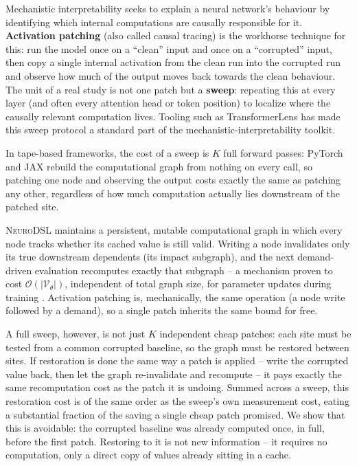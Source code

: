 \documentclass{article}
\begin{document}
Mechanistic interpretability seeks to explain a neural network's behaviour by identifying which
internal computations are causally responsible for it. \textbf{Activation patching} (also called
causal tracing) \cite{rome,causalmediation} is the workhorse technique for this: run the model
once on a ``clean'' input and once on a ``corrupted'' input, then copy a single internal
activation from the clean run into the corrupted run and observe how much of the output moves
back towards the clean behaviour. The unit of a real study is not one patch but a \textbf{sweep}:
repeating this at every layer (and often every attention head or token position) to localize
where the causally relevant computation lives. Tooling such as TransformerLens
\cite{transformerlens} has made this sweep protocol a standard part of the
mechanistic-interpretability toolkit.

In tape-based frameworks, the cost of a sweep is $K$ full forward passes: PyTorch \cite{pytorch}
and JAX \cite{jax} rebuild the computational graph from nothing on every call, so patching one
node and observing the output costs exactly the same as patching any other, regardless of how
much computation actually lies downstream of the patched site.

\textsc{NeuroDSL} \cite{neurodsl} maintains a persistent, mutable computational graph in which
every node tracks whether its cached value is still valid. Writing a node invalidates only its
true downstream dependents (its impact subgraph), and the next demand-driven evaluation
recomputes exactly that subgraph -- a mechanism proven to cost
$\mathcal{O}(|\mathcal{V}_{\theta}|)$, independent of total graph size, for parameter updates
during training \cite{neurodsl}. Activation patching is, mechanically, the same operation (a node
write followed by a demand), so a single patch inherits the same bound for free.

A full sweep, however, is not just $K$ independent cheap patches: each site must be tested from a
common corrupted baseline, so the graph must be restored between sites. If restoration is done
the same way a patch is applied -- write the corrupted value back, then let the graph
re-invalidate and recompute -- it pays exactly the same recomputation cost as the patch it is
undoing. Summed across a sweep, this restoration cost is of the same order as the sweep's own
measurement cost, eating a substantial fraction of the saving a single cheap patch promised. We
show that this is avoidable: the corrupted baseline was already computed once, in full, before
the first patch. Restoring to it is not new information -- it requires no computation, only a
direct copy of values already sitting in a cache.
\end{document}
